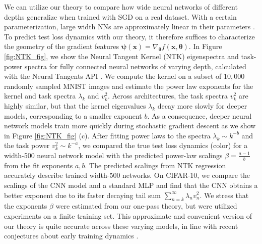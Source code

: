 \documentclass{article} %
\def\x{\bm x}
\def\x{\mathbf x}
\begin{document}
We can utilize our theory to compare how wide neural networks of different depths generalize when trained with SGD on a real dataset. With a certain parameterization, large width NNs are approximately linear in their parameters \citep{Lee_2020}. To predict test loss dynamics with our theory, it therefore suffices to characterize the geometry of the gradient features $\bm\psi(\x) = \nabla_{\bm\theta} f(\x,\bm\theta)$. In Figure \ref{fig:NTK_fig}, we show the Neural Tangent Kernel (NTK) eigenspectra and task-power spectra for fully connected neural networks of varying depth, calculated with the Neural Tangents API \citep{neuraltangents2020}. We compute the kernel on a subset of $10,000$ randomly sampled MNIST images and estimate the power law exponents for the kernel and task spectra $\lambda_k$ and $v_k^2$. Across architectures, the task spectra $v_k^2$ are highly similar, but that the kernel eigenvalues $\lambda_k$ decay more slowly for deeper models, corresponding to a smaller exponent $b$. As a consequence, deeper neural network models train more quickly during stochastic gradient descent as we show in Figure \ref{fig:NTK_fig} (c). After fitting power laws to the spectra $\lambda_k \sim k^{-b}$ and the task power $v_k^2 \sim k^{-a}$, we compared the true test loss dynamics (color) for a width-500 neural network model with the predicted power-law scalings $\beta = \frac{a-1}{b}$ from the fit exponents $a,b$. The predicted scalings from NTK regression accurately describe trained width-500 networks. On CIFAR-10, we compare the scalings of the CNN model and a standard MLP and find that the CNN obtains a better exponent due to its faster decaying tail sum $\sum_{n=k}^{\infty} \lambda_n v_n^2$. We stress that the exponents $\beta$ were estimated from our one-pass theory, but were utilized experiments on a finite training set. This approximate and convenient version of our theory is quite accurate across these varying models, in line with recent conjectures about early training dynamics \citep{nakkiran2021the}.
\end{document}
